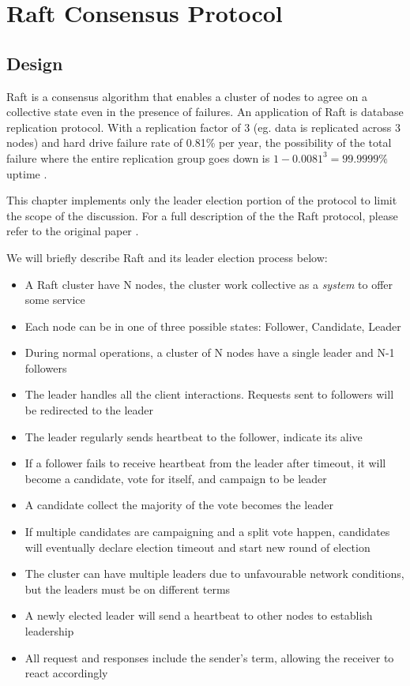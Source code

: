 \chapter{Raft Consensus Protocol}

\section{Design}

Raft is a consensus algorithm that enables a cluster of nodes to agree on a
collective state even in the presence of failures. An application of Raft is
database replication protocol. With a replication factor of 3 (eg. data is
replicated across 3 nodes) and hard drive failure rate of 0.81\% per year, the
possibility of the total failure where the entire replication group goes down is
$1-0.0081^3 = 99.9999\%$ uptime \cite{backblaze}.\newline

This chapter implements only the leader election portion of the protocol to
limit the scope of the discussion. For a full description of the the Raft
protocol, please refer to the original paper \cite{raft}.\newline

We will briefly describe Raft and its leader election process below: 
\begin{itemize}
    \item A Raft cluster have N nodes, the cluster work collective as a
    \textit{system} to offer some service
    \item Each node can be in one of three possible states: Follower, Candidate, Leader
    \item During normal operations, a cluster of N nodes have a single leader
    and N-1 followers
    \item The leader handles all the client interactions. Requests sent to followers will be 
    redirected to the leader
    \item The leader regularly sends heartbeat to the follower, indicate its
    alive
    \item If a follower fails to receive heartbeat from the leader after
    timeout, it will become a candidate, vote for itself, and campaign to be
    leader
    \item A candidate collect the majority of the vote becomes the leader
    \item If multiple candidates are campaigning and a split vote happen,
    candidates will eventually declare election timeout and start new round of
    election
    \item The cluster can have multiple leaders due to unfavourable network conditions, 
    but the leaders must be on different terms 
    \item A newly elected leader will send a heartbeat to other nodes to establish 
    leadership 
    \item All request and responses include the sender's term, allowing the
    receiver to react accordingly
\end{itemize}

